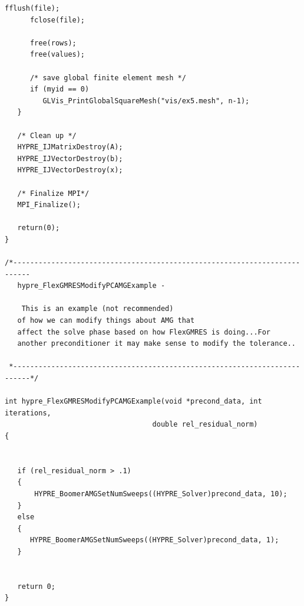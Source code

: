 \documentclass[a4paper,10pt]{article}
\numberwithin{figure}{section}
\numberwithin{table}{section}
\begin{document}
\begin{lstlisting}[frame=single, breaklines=true]
      fflush(file);
      fclose(file);

      free(rows);
      free(values);

      /* save global finite element mesh */
      if (myid == 0)
         GLVis_PrintGlobalSquareMesh("vis/ex5.mesh", n-1);
   }

   /* Clean up */
   HYPRE_IJMatrixDestroy(A);
   HYPRE_IJVectorDestroy(b);
   HYPRE_IJVectorDestroy(x);

   /* Finalize MPI*/
   MPI_Finalize();

   return(0);
}

/*--------------------------------------------------------------------------
   hypre_FlexGMRESModifyPCAMGExample -

    This is an example (not recommended)
   of how we can modify things about AMG that
   affect the solve phase based on how FlexGMRES is doing...For
   another preconditioner it may make sense to modify the tolerance..

 *--------------------------------------------------------------------------*/

int hypre_FlexGMRESModifyPCAMGExample(void *precond_data, int iterations,
                                   double rel_residual_norm)
{


   if (rel_residual_norm > .1)
   {
	   HYPRE_BoomerAMGSetNumSweeps((HYPRE_Solver)precond_data, 10);
   }
   else
   {
      HYPRE_BoomerAMGSetNumSweeps((HYPRE_Solver)precond_data, 1);
   }


   return 0;
}

\end{lstlisting}
\end{document}
